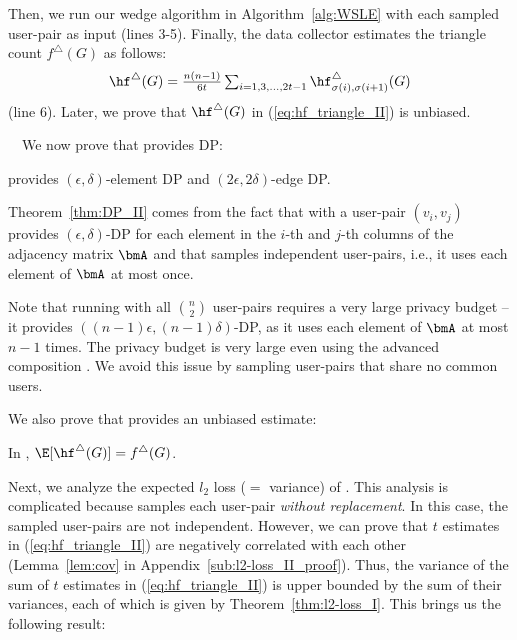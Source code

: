 Then, we run our wedge algorithm \AlgWSLE{} in Algorithm~\ref{alg:WSLE} with each sampled user-pair as input (lines 3-5). 
Finally, the data collector estimates the triangle count $f^\triangle(G)$ as follows: 
\begin{align}
    \hf^\triangle(G) = \textstyle{\frac{n(n-1)}{6t} \sum_{i=1, 3, \ldots, 2t-1} \hf_{\sigma(i),\sigma(i+1)}^\triangle(G)} 
   \label{eq:hf_triangle_II}
\end{align}
(line 6). Later, we prove that $\hf^\triangle(G)$ in (\ref{eq:hf_triangle_II}) is unbiased. 

\smallskip
{}~~We now prove that 
\AlgWSTri{} provides DP: 
\begin{theorem}
\label{thm:DP_II}
\AlgWSTri{} provides $(\epsilon, \delta)$-element DP and $(2\epsilon, 2\delta)$-edge DP. 
\end{theorem}
Theorem~\ref{thm:DP_II} comes from the fact that 
\AlgWSLE{} with a user-pair $(v_i,v_j)$ provides $(\epsilon,\delta)$-DP for each element in the $i$-th and $j$-th columns of the adjacency matrix $\bmA$ and that \AlgWSTri{} samples independent user-pairs, i.e., it uses each element of $\bmA$ at most once. 

Note that running \AlgWSLE{} with all $\binom{n}{2}$ user-pairs requires a very large privacy budget --  
it provides $((n-1) \epsilon, (n-1) \delta)$-DP, as it uses each element of $\bmA$ at most $n-1$ times. 
The privacy budget is very large even using the advanced composition \cite{DP,Kairouz_ICML15}. 
We avoid this issue by sampling user-pairs that share no common users. 

We also prove that 
\AlgWSTri{} provides an unbiased estimate: 
\begin{theorem}
\label{thm:unbiased_II}
In \AlgWSTri{}, $\E[\hf^\triangle(G)] = f^\triangle(G)$. 
\end{theorem}

Next, we analyze the expected $l_2$ loss ($=$ variance) of \AlgWSTri{}. 
This analysis is complicated because \AlgWSTri{} samples each user-pair \textit{without replacement}. 
In this case, the sampled user-pairs are not independent. 
However, we can prove that 
$t$ estimates in (\ref{eq:hf_triangle_II}) are negatively correlated with each other (Lemma~\ref{lem:cov} in Appendix~\ref{sub:l2-loss_II_proof}). 
Thus, the variance of the sum of $t$ estimates 
in (\ref{eq:hf_triangle_II}) is upper bounded by the sum of their variances, each of which is given by Theorem~\ref{thm:l2-loss_I}. 
This brings us the following result: 

